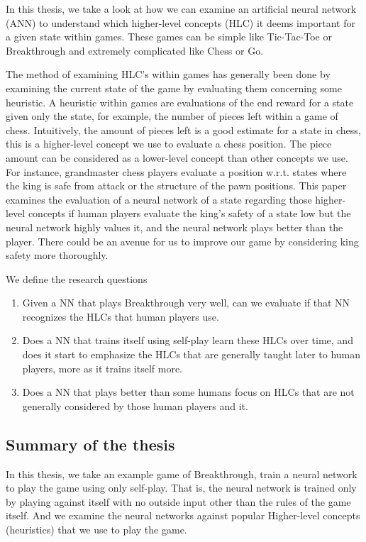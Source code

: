 In this thesis, we take a look at how we can examine an artificial neural network (ANN)
to understand which higher-level concepts (HLC) it deems important for a given state
within games. These games can be simple like Tic-Tac-Toe or Breakthrough and extremely
complicated like Chess or Go. 

The method of examining HLC's within games has generally been done by examining the
current state of the game by evaluating them concerning some heuristic. A heuristic within games are evaluations of the end reward for a state given only the state, for example,
the number of pieces left within a game of chess. Intuitively, the amount of pieces
left is a good estimate for a state in chess, this is a higher-level concept we
use to evaluate a chess position. The piece amount can be considered as a lower-level concept
than other concepts we use. For instance, grandmaster chess players evaluate a position w.r.t. states
where the king is safe from attack or the structure of the pawn positions.
This paper examines the evaluation of a neural network of a state regarding those higher-level concepts if human players evaluate the king's safety of a state
low but the neural network highly values it, and the neural network plays better
than the player. There could be an avenue for us to improve our game by considering king safety more thoroughly.

We define the research questions

\begin{enumerate}
  \item Given a NN that plays Breakthrough very well, can we evaluate if that NN recognizes the 
  HLCs that human players use.
  \item Does a NN that trains itself using self-play learn these HLCs over time, and does it start to emphasize 
  the HLCs that are generally taught later to human players, more as it trains itself more.
  \item Does a NN that plays better than some humans focus on HLCs that are not generally 
  considered by those human players and it.
\end{enumerate}

\subsection{Summary of the thesis}

In this thesis, we take an example game of Breakthrough, train a neural network to play the game using only self-play. That is, the neural network is trained only by playing against itself with no outside input other than the rules of the game itself. And we examine the neural networks against popular Higher-level concepts (heuristics) that we use to play the game.
